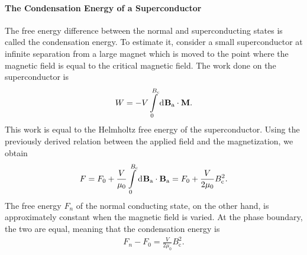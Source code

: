 \paragraph{The Condensation Energy of a Superconductor}
The free energy difference between the normal and superconducting states is called the condensation energy. To estimate it, consider a small superconductor at infinite separation from a large magnet which is moved to the point where the magnetic field is equal to the critical magnetic field. The work done on the superconductor is
\begin{align*}
	W = -V\int\limits_{0}^{B_{\text{c}}}\dd[]{\vb{B}_{\text{a}}}\cdot\vb{M}.
\end{align*}
This work is equal to the Helmholtz free energy of the superconductor. Using the previously derived relation between the applied field and the magnetization, we obtain
\begin{align*}
	F = F_{0} + \frac{V}{\mu_{0}}\int\limits_{0}^{B_{\text{c}}}\dd[]{\vb{B}_{\text{a}}}\cdot\vb{B}_{\text{a}} = F_{0} + \frac{V}{2\mu_{0}}B_{\text{c}}^{2}.
\end{align*}
The free energy $F_{n}$ of the normal conducting state, on the other hand, is approximately constant when the magnetic field is varied. At the phase boundary, the two are equal, meaning that the condensation energy is
\begin{align*}
	F_{n} - F_{0} = \frac{V}{2\mu_{0}}B_{\text{c}}^{2}.
\end{align*}
